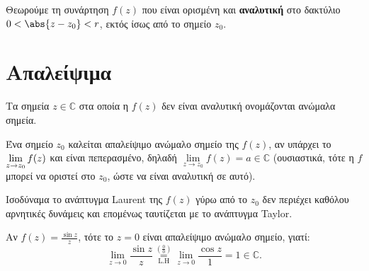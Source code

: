 




\everymath{\displaystyle}
\thispagestyle{empty}







\begin{center}
  \minibox{\large\bfseries \textcolor{Col1}{Ανώμαλα Σημεία}}
\end{center}

\vspace{\baselineskip} 

Θεωρούμε τη συνάρτηση $f(z)$ που είναι ορισμένη και \textbf{αναλυτική} στο δακτύλιο 
$0<\abs{z-z_0}<r$, εκτός ίσως από το σημείο $z_0$. 


\section*{Απαλείψιμα}

\begin{dfn}
  Τα σημεία $z\in \mathbb{C}$ στα οποία η $f(z)$ δεν είναι αναλυτική ονομάζονται 
  \textcolor{Col1}{ανώμαλα σημεία}.
\end{dfn}

\begin{dfn} 
  Ένα σημείο $z_0$ καλείται \textcolor{Col1}{απαλείψιμο} ανώμαλο σημείο της $f(z)$, 
  αν υπάρχει το $\lim\limits_{\smash{z\to z_0}}f(z)$ και είναι πεπερασμένο, 
  δηλαδή $\lim\limits_{z\to z_0}f(z)=a\in \mathbb{C}$ (ουσιαστικά, τότε η $f$
  μπορεί να οριστεί στο $z_{0}$, ώστε να είναι αναλυτική σε αυτό).

  \begin{myitemize}
    \item Ισοδύναμα το ανάπτυγμα Laurent της $f(z)$ \textcolor{Col2}{γύρω από το $z_0$} 
      δεν περιέχει καθόλου αρνητικές δυνάμεις και επομένως ταυτίζεται με το ανάπτυγμα 
      Taylor.
  \end{myitemize} 
\end{dfn}

\begin{example}
  Αν $f(z)=\frac{\sin z}{z}$, τότε το $z=0$ είναι απαλείψιμο ανώμαλο σημείο, γιατί:
  \[
    \lim\limits_{z\to 0}\frac{\sin z}{z} 
    \overset{(\frac{0}{0})}{\underset{\text{L.H}}{=}} 
    \lim\limits_ {z\to 0}\frac{\cos z}{1}=1\in \mathbb{C}.
  \]
\end{example}

